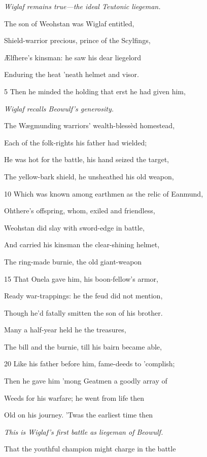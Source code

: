 

\emph{Wiglaf remains
true—the ideal
Teutonic liegeman.}

The son of Weohstan was Wiglaf entitled,

Shield-warrior precious, prince of the Scylfings,

Ælfhere’s kinsman: he saw his dear liegelord

Enduring the heat ’neath helmet and visor.

5
Then he minded the holding that erst he had given him,

\emph{Wiglaf recalls
Beowulf’s generosity.}

The Wægmunding warriors’ wealth-blessèd homestead,

Each of the folk-rights his father had wielded;

He was hot for the battle, his hand seized the target,

The yellow-bark shield, he unsheathed his old weapon,

10
Which was known among earthmen as the relic of Eanmund,

Ohthere’s offspring, whom, exiled and friendless,

Weohstan did slay with sword-edge in battle,

And carried his kinsman the clear-shining helmet,

The ring-made burnie, the old giant-weapon

15
That Onela gave him, his boon-fellow’s armor,

Ready war-trappings: he the feud did not mention,

Though he’d fatally smitten the son of his brother.

Many a half-year held he the treasures,

The bill and the burnie, till his bairn became able,

20
Like his father before him, fame-deeds to ’complish;

Then he gave him ’mong Geatmen a goodly array of

Weeds for his warfare; he went from life then

Old on his journey. ’Twas the earliest time then

\emph{This is Wiglaf’s
first battle as liegeman
of Beowulf.}

That the youthful champion might charge in the battle

